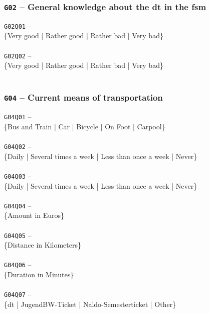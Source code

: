 \subsubsection{\texttt{G02} -- General knowledge about the \gls{dt} in the \gls{fsm}}
\begin{displayquote}
    \texttt{G02Q01} -- \\
    \{Very good | Rather good | Rather bad | Very bad\}\\\\
    \texttt{G02Q02} -- \\
    \{Very good | Rather good | Rather bad | Very bad\}\\\\
\end{displayquote}

\subsubsection{\texttt{G04} -- Current means of transportation}
\begin{displayquote}
    \texttt{G04Q01} -- \\
    \{Bus and Train | Car | Bicycle | On Foot | Carpool\}\\\\
    \texttt{G04Q02} -- \\
    \{Daily | Several times a week | Less than once a week | Never\}\\\\
    \texttt{G04Q03} -- \\
    \{Daily | Several times a week | Less than once a week | Never\}\\\\
    \texttt{G04Q04} -- \\
    \{Amount in Euros\}\\\\
    \texttt{G04Q05} -- \\
    \{Distance in Kilometers\}\\\\
    \texttt{G04Q06} -- \\
    \{Duration in Minutes\}\\\\
    \texttt{G04Q07} -- \\
    \{\gls{dt} | JugendBW-Ticket | Naldo-Semesterticket | Other\}\\\\
\end{displayquote}

